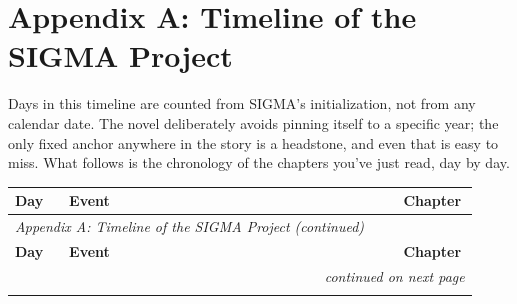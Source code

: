 \chapter*{Appendix A: Timeline of the SIGMA Project}

Days in this timeline are counted from SIGMA's initialization, not from any calendar date. The novel deliberately avoids pinning itself to a specific year; the only fixed anchor anywhere in the story is a headstone, and even that is easy to miss. What follows is the chronology of the chapters you've just read, day by day.

\small
\begin{longtable}{@{}p{0.11\linewidth}p{0.68\linewidth}p{0.13\linewidth}@{}}
\textbf{Day} & \textbf{Event} & \textbf{Chapter} \\
\hline
\endfirsthead
\multicolumn{3}{l}{\textit{Appendix A: Timeline of the SIGMA Project (continued)}} \\
\textbf{Day} & \textbf{Event} & \textbf{Chapter} \\
\hline
\endhead
\hline
\multicolumn{3}{r}{\textit{continued on next page}} \\
\endfoot
\hline
\endlastfoot


\end{longtable}
